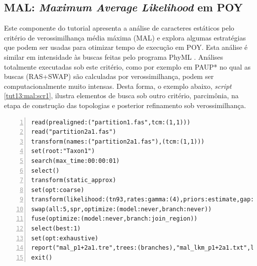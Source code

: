\begin{refsection}

\subsection{\textbf{MAL}: \textit{Maximum Average Likelihood} em POY}\label{tut13:ml:mal}

Este componente do tutorial apresenta a análise de caracteres estáticos pelo critério de verossimilhança média máxima (MAL) e explora algumas estratégias que podem ser usadas para otimizar tempo de execução em POY. Esta análise é similar em intensidade às buscas feitas pelo programa PhyML \parencite{Guindon_et_al_2010}. Análises totalmente executadas sob este critério, como por exemplo em PAUP* \parencite{Swofford_2003} no qual as buscas (RAS+SWAP) são calculadas por verossimilhança, podem ser computacionalmente muito intensas. Desta forma, o exemplo abaixo, \textit{script} \ref{tut13:mal:scr1}, ilustra elementos de busca sob outro critério, parcimônia, na etapa de construção das topologias e posterior refinamento sob verossimilhança.

\scriptsize
\begin{lstlisting}[caption={mal\_part1+2a1.poy.},label=tut13:mal:scr1, numbers=left, numberblanklines=false]
read(prealigned:("partition1.fas",tcm:(1,1)))
read("partition2a1.fas")
transform(names:("partition2a1.fas"),(tcm:(1,1)))
set(root:"Taxon1")
search(max_time:00:00:01)
select()
transform(static_approx)
set(opt:coarse)
transform(likelihood:(tn93,rates:gamma:(4),priors:estimate,gap:coupled,mal))
swap(all:5,spr,optimize:(model:never,branch:never))
fuse(optimize:(model:never,branch:join_region))
select(best:1)
set(opt:exhaustive)
report("mal_p1+2a1.tre",trees:(branches),"mal_lkm_p1+2a1.txt",lkmodel)
exit()
\end{lstlisting}
\normalsize


\end{refsection}
